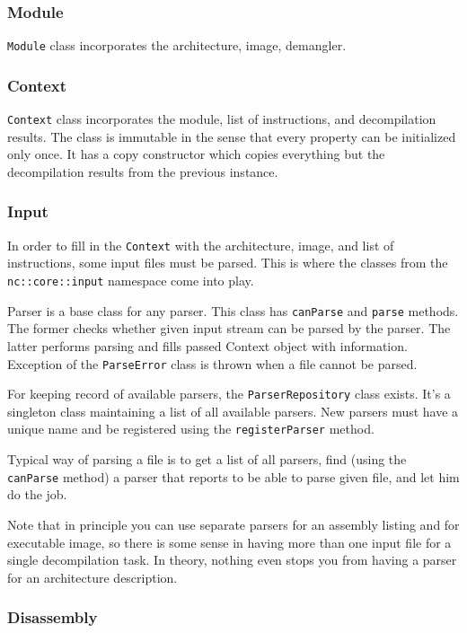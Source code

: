 \documentclass[a4paper,12pt]{article}
\newcommand{\ident}[1]{\texttt{#1}}
\begin{document}
\subsubsection{Module}

\ident{Module} class incorporates the architecture, image, demangler.

\subsubsection{Context}

\ident{Context} class incorporates the module, list of instructions, and decompilation results.
The class is immutable in the sense that every property can be initialized only once.
It has a copy constructor which copies everything but the decompilation results from the previous instance.

\subsubsection{Input}

In order to fill in the \ident{Context} with the architecture, image, and list of instructions, some input files must be parsed.
This is where the classes from the \ident{nc::core::input} namespace come into play.

Parser is a base class for any parser.
This class has \ident{canParse} and \ident{parse} methods.
The former checks whether given input stream can be parsed by the parser.
The latter performs parsing and fills passed Context object with information.
Exception of the \ident{ParseError} class is thrown when a file cannot be parsed.

For keeping record of available parsers, the \ident{ParserRepository} class exists.
It's a singleton class maintaining a list of all available parsers.
New parsers must have a unique name and be registered using the \ident{registerParser} method.

Typical way of parsing a file is to get a list of all parsers, find (using the \ident{canParse} method) a parser that reports to be able to parse given file, and let him do the job.

Note that in principle you can use separate parsers for an assembly listing and for executable image, so there is some sense in having more than one input file for a single decompilation task.
In theory, nothing even stops you from having a parser for an architecture description.

\subsubsection{Disassembly}
\end{document}
